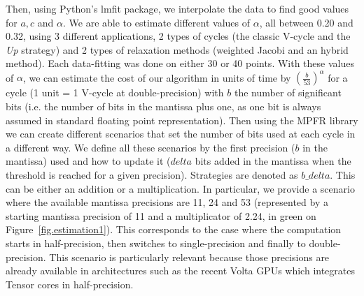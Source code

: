 Then, using Python's lmfit package, we interpolate the data to find good values
for $a,c$ and $\alpha$. We are able to estimate different values of $\alpha$,
all between 0.20 and 0.32, using 3 different applications, 2 types of cycles
(the classic V-cycle and the \emph{Up} strategy) and 2 types of relaxation
methods (weighted Jacobi and an hybrid method).  Each data-fitting was done on
either 30 or 40 points.  With these values of $\alpha$, we can estimate the
cost of our algorithm in units of time by $\left(\frac{b}{53}\right)^\alpha$
for a cycle (1 unit = 1 V-cycle at double-precision) with $b$ the number of
significant bits (i.e. the number of bits in the mantissa plus one, as one bit
is always assumed in standard floating point representation). Then using the
MPFR library we can create different scenarios that set the number of bits used
at each cycle in a different way. We define all these scenarios by the first
precision ($b$ in the mantissa) used and how to update it ($delta$ bits added
in the mantissa when the threshold is reached for a given precision).
Strategies are denoted as $b\_delta$. This can be either an addition or a
multiplication. In particular, we provide a scenario where the available
mantissa precisions are 11, 24 and 53 (represented by a starting mantissa
precision of 11 and a multiplicator of 2.24, in green on Figure~\ref{fig.estimation1}). This corresponds to the case
where the computation starts in half-precision, then switches to
single-precision and finally to double-precision. This scenario is particularly
relevant because those precisions are already available in architectures such
as the recent Volta GPUs which integrates Tensor cores in half-precision.


